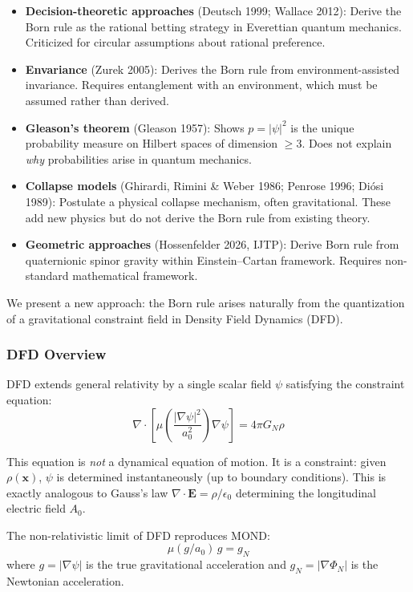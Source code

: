 \documentclass[11pt,a4paper]{article}
\begin{document}
\begin{itemize}
\item \textbf{Decision-theoretic approaches} (Deutsch 1999; Wallace 2012): Derive the Born rule as the rational betting strategy in Everettian quantum mechanics. Criticized for circular assumptions about rational preference.
\item \textbf{Envariance} (Zurek 2005): Derives the Born rule from environment-assisted invariance. Requires entanglement with an environment, which must be assumed rather than derived.
\item \textbf{Gleason's theorem} (Gleason 1957): Shows $p = |\psi|^2$ is the unique probability measure on Hilbert spaces of dimension $\geq 3$. Does not explain \emph{why} probabilities arise in quantum mechanics.
\item \textbf{Collapse models} (Ghirardi, Rimini \& Weber 1986; Penrose 1996; Di\'{o}si 1989): Postulate a physical collapse mechanism, often gravitational. These add new physics but do not derive the Born rule from existing theory.
\item \textbf{Geometric approaches} (Hossenfelder 2026, IJTP): Derive Born rule from quaternionic spinor gravity within Einstein--Cartan framework. Requires non-standard mathematical framework.
\end{itemize}

We present a new approach: the Born rule arises naturally from the quantization of a gravitational constraint field in Density Field Dynamics (DFD).

\subsubsection{DFD Overview}

DFD extends general relativity by a single scalar field $\psi$ satisfying the constraint equation:
\begin{equation}
\nabla\cdot\left[\mu\!\left(\frac{|\nabla\psi|^2}{a_0^2}\right)\nabla\psi\right] = 4\pi G_N\rho
\end{equation}

This equation is \emph{not} a dynamical equation of motion. It is a constraint: given $\rho(\mathbf{x})$, $\psi$ is determined instantaneously (up to boundary conditions). This is exactly analogous to Gauss's law $\nabla\cdot\mathbf{E} = \rho/\epsilon_0$ determining the longitudinal electric field $A_0$.

The non-relativistic limit of DFD reproduces MOND:
\begin{equation}
\mu(g/a_0)\,g = g_N
\end{equation}
where $g = |\nabla\psi|$ is the true gravitational acceleration and $g_N = |\nabla\Phi_N|$ is the Newtonian acceleration.
\end{document}
